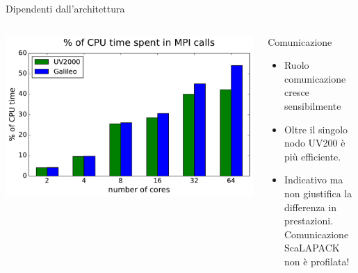 \documentclass[8pt]{beamer}
\begin{document}
\begin{frame}{Dipendenti dall'architettura}
\begin{columns}
		\begin{center}			
			\vspace{-1cm}
			\includegraphics[width=1\textwidth]{arch_mpi_perc.pdf}			
		\end{center}
		\begin{overlayarea}{\linewidth}{\textheight}
		\begin{block}{Comunicazione}
			\begin{itemize}
				\item<1-> Ruolo comunicazione cresce sensibilmente
				\item<2-> Oltre il singolo nodo UV200 \`e pi\`u efficiente.
				\item<3-> Indicativo ma non giustifica la differenza in prestazioni.\\Comunicazione ScaLAPACK non \`e profilata!
			\end{itemize}		
		\end{block}

		\end{overlayarea}
\end{columns}

\end{frame}
\end{document}
